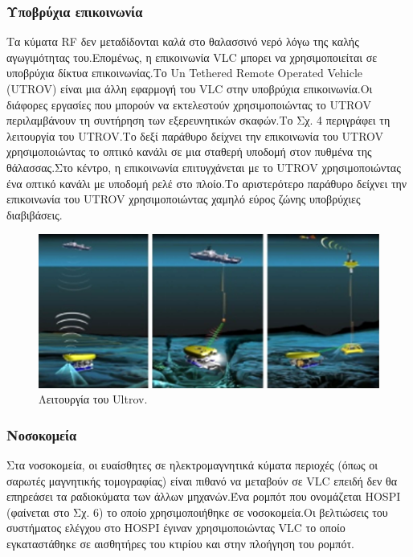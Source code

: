 \documentclass[conference]{IEEEtran}
\begin{document}
\subsubsection{Υποβρύχια επικοινωνία}
Τα κύματα RF δεν μεταδίδονται  καλά στο θαλασσινό νερό λόγω της καλής αγωγιμότητας του.Επομένως, η επικοινωνία VLC  μπορει  να χρησιμοποιείται σε υποβρύχια δίκτυα επικοινωνίας.Το Un Tethered Remote Operated Vehicle (UTROV) είναι μια άλλη εφαρμογή του VLC στην υποβρύχια επικοινωνία.Οι διάφορες εργασίες που μπορούν να εκτελεστούν χρησιμοποιώντας το UTROV περιλαμβάνουν τη συντήρηση των εξερευνητικών σκαφών.Το Σχ. 4 περιγράφει τη λειτουργία του UTROV.Το δεξί παράθυρο δείχνει την επικοινωνία του UTROV χρησιμοποιώντας το οπτικό κανάλι σε μια σταθερή υποδομή στον πυθμένα της θάλασσας.Στο κέντρο, η επικοινωνία επιτυγχάνεται με το UTROV χρησιμοποιώντας ένα οπτικό κανάλι με υποδομή ρελέ στο πλοίο.Το αριστερότερο παράθυρο δείχνει την επικοινωνία του UTROV χρησιμοποιώντας χαμηλό εύρος ζώνης υποβρύχιες διαβιβάσεις.

\begin{figure}[h]
  \includegraphics[width=\linewidth]{3.png}
  \caption{Λειτουργία του Ultrov.} 
\end{figure}

\subsubsection{Νοσοκομεία}
Στα νοσοκομεία, οι ευαίσθητες σε ηλεκτρομαγνητικά κύματα περιοχές (όπως οι σαρωτές μαγνητικής τομογραφίας) είναι πιθανό να μεταβούν σε VLC επειδή δεν θα επηρεάσει τα ραδιοκύματα των άλλων μηχανών.Ένα ρομπότ που ονομάζεται HOSPI (φαίνεται στο Σχ. 6) το οποίο  χρησιμοποιήθηκε  σε νοσοκομεία.Οι βελτιώσεις του συστήματος ελέγχου στο HOSPI έγιναν χρησιμοποιώντας VLC  το οποίο εγκαταστάθηκε  σε αισθητήρες του κτιρίου και στην πλοήγηση του ρομπότ.
\end{document}

